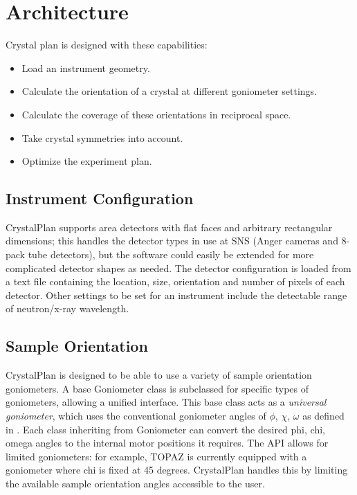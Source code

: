 \documentclass[draft]{iucr}              %
\begin{document}
\section{Architecture}

Crystal plan is designed with these capabilities:

\begin{itemize}
  \item Load an instrument geometry.
  \item Calculate the orientation of a crystal at different goniometer settings.
  \item Calculate the coverage of these orientations in reciprocal space.
  \item Take crystal symmetries into account.
  \item Optimize the experiment plan.
\end{itemize}

\subsection{Instrument Configuration}

CrystalPlan supports area detectors with flat faces and arbitrary rectangular
dimensions; this handles the detector types in use at SNS (Anger cameras and
8-pack tube detectors), but the software could easily be extended for more
complicated detector shapes as needed. The detector configuration is loaded from
a text file containing the location, size, orientation and number of pixels of
each detector. Other settings to be set for an instrument include the
detectable range of neutron/x-ray wavelength.


\subsection{Sample Orientation}

CrystalPlan is designed to be able to use a variety of sample orientation
goniometers. A base Goniometer class is subclassed for specific types of
goniometers, allowing a unified interface. This base class acts as a
\emph{universal goniometer},
which uses the conventional goniometer angles of
$\phi$, $\chi$, $\omega$ as defined in \cite{busing67}.
Each class inheriting from Goniometer can convert
the desired phi, chi, omega angles to the internal motor positions it requires. The API allows
for limited goniometers: for example, TOPAZ is currently equipped with a
goniometer where chi is fixed at 45 degrees. CrystalPlan handles this by
limiting the available sample orientation angles accessible to the user.        
   
\end{document}
